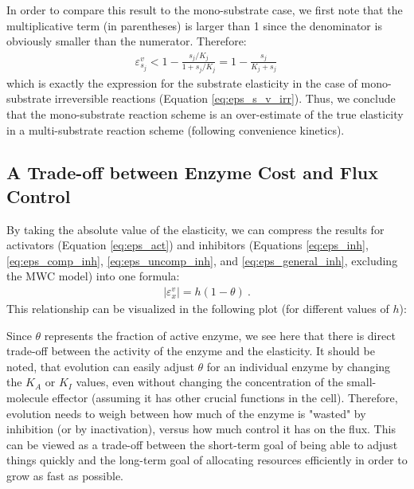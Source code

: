 \documentclass[12pt,a4paper]{article}
\begin{document}
In order to compare this result to the mono-substrate case, we first note that the multiplicative term (in parentheses) is larger than 1 since the denominator is obviously smaller than the numerator. Therefore:
\begin{eqnarray}
\varepsilon^{v}_{s_j} < 1 -  \frac{ s_j/K_j}{1 +  s_j/K_j} = 1 - \frac{ s_j}{K_j +  s_j}\,
\end{eqnarray}
which is exactly the expression for the substrate elasticity in the case of mono-substrate irreversible reactions (Equation \ref{eq:eps_s_v_irr}). Thus, we conclude that the mono-substrate reaction scheme is an over-estimate of the true elasticity in a multi-substrate reaction scheme (following convenience kinetics).

\subsection{A Trade-off between Enzyme Cost and Flux Control}
By taking the absolute value of the elasticity, we can compress the results for activators (Equation \ref{eq:eps_act}) and inhibitors (Equations \ref{eq:eps_inh}, \ref{eq:eps_comp_inh}, \ref{eq:eps_uncomp_inh}, and \ref{eq:eps_general_inh}, excluding the MWC model) into one formula:
\begin{eqnarray}
|\varepsilon_x^v| = h (1 - \theta)~. \label{eq:abs_elast}
\end{eqnarray}
This relationship can be visualized in the following plot (for different values of $h$):
\begin{center}
\end{center}

Since $\theta$ represents the fraction of active enzyme, we see here that there is direct trade-off between the activity of the enzyme and the elasticity. It should be noted, that evolution can easily adjust $\theta$ for an individual enzyme by changing the $K_A$ or $K_I$ values, even without changing the concentration of the small-molecule effector (assuming it has other crucial functions in the cell). Therefore, evolution needs to weigh between how much of the enzyme is "wasted" by inhibition (or by inactivation), versus how much control it has on the flux. This can be viewed as a trade-off between the short-term goal of being able to adjust things quickly and the long-term goal of allocating resources efficiently in order to grow as fast as possible.
\end{document}
